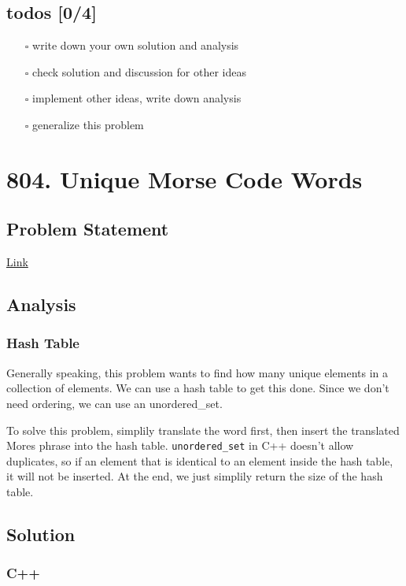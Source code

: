 \documentclass[12pt]{article}
\begin{document}
\subsection{todos [0/4]}
\label{sec:org52c75b9}
\begin{itemize}
\item[{$\square$}] write down your own solution and analysis
\item[{$\square$}] check solution and discussion for other ideas
\item[{$\square$}] implement other ideas, write down analysis
\item[{$\square$}] generalize this problem
\end{itemize}
\section{804. Unique Morse Code Words}
\label{sec:org64c21f0}
\subsection{Problem Statement}
\label{sec:org110274c}
\href{https://leetcode.com/problems/unique-morse-code-words/}{Link}
\subsection{Analysis}
\label{sec:orga8fc41a}
\subsubsection{Hash Table}
\label{sec:org230e9d0}
Generally speaking, this problem wants to find how many unique elements in a collection of elements. We can use a hash table to get this done. Since we don't need ordering, we can use an unordered\_set.

To solve this problem, simplily translate the word first, then insert the translated Mores phrase into the hash table. \texttt{unordered\_set} in C++ doesn't allow duplicates, so if an element that is identical to an element inside the hash table, it will not be inserted. At the end, we just simplily return the size of the hash table.
\subsection{Solution}
\label{sec:orge680c42}
\subsubsection{C++}
\label{sec:org5da7ecc}
\end{document}

